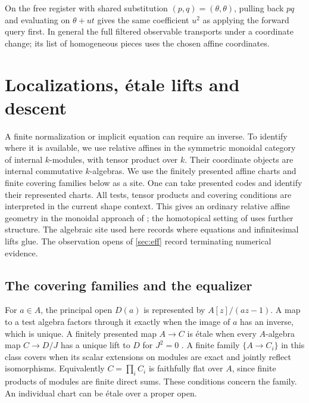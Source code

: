 \documentclass[11pt,a4paper]{article}
\theoremstyle{definition}
\theoremstyle{remark}\newaliascnt{remark}{theorem}
\numberwithin{equation}{section}
\begin{document}
On the free register with shared substitution $(p,q)=(\theta,\theta)$, pulling back $pq$ and evaluating on $\theta+ut$ gives the same coefficient $u^2$ as applying the forward query first. In general the full filtered observable transports under a coordinate change; its list of homogeneous pieces uses the chosen affine coordinates.

\section{Localizations, \texorpdfstring{\'etale}{etale} lifts and descent}\label{sec:site}
A finite normalization or implicit equation can require an inverse. To identify where it is available, we use relative affines in the symmetric monoidal category of internal $k$-modules, with tensor product over $k$. Their coordinate objects are internal commutative $k$-algebras. We use the finitely presented affine charts and finite covering families below as a site. One can take presented codes and identify their represented charts. All tests, tensor products and covering conditions are interpreted in the current shape context. This gives an ordinary relative affine geometry in the monoidal approach of \cite{relative:tvq}; the homotopical setting of \cite{relative:hag} uses further structure. The algebraic site used here records where equations and infinitesimal lifts glue. The observation opens of \cref{sec:eff} record terminating numerical evidence.

\subsection{The covering families and the equalizer}
For $a\in A$, the principal open $D(a)$ is represented by $A[z]/(az-1)$. A map to a test algebra factors through it exactly when the image of $a$ has an inverse, which is unique. A finitely presented map $A\to C$ is \'etale when every $A$-algebra map $C\to D/J$ has a unique lift to $D$ for $J^2=0$ \cite{etale}. A finite family $\{A\to C_i\}$ in this class covers when its scalar extensions on modules are exact and jointly reflect isomorphisms. Equivalently $C=\prod_i C_i$ is faithfully flat over $A$, since finite products of modules are finite direct sums. These conditions concern the family. An individual chart can be \'etale over a proper open.
\end{document}

